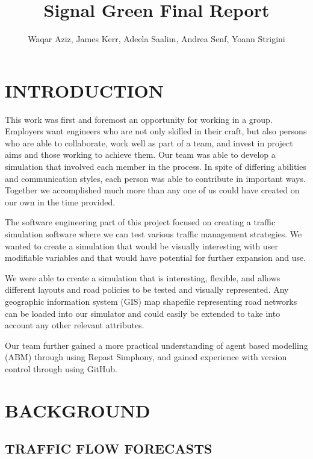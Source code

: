 \documentclass[11pt]{article}
\begin{document}
\title{Signal Green Final Report}

\author{Waqar Aziz, James Kerr, Adeela Saalim, Andrea Senf, Yoann Strigini}

\maketitle 


\section{INTRODUCTION}


This work was first and foremost an opportunity for working in a group. Employers want engineers who are not only skilled in their craft, but also persons who are able to collaborate, work well as part of a team, and invest in project aims and those working to achieve them. Our team was able to develop a simulation that involved each member in the process. In spite of differing abilities and communication styles, each person was able to contribute in important ways. Together we accomplished much more than any one of us could have created on our own in the time provided.

The software engineering part of this project focused on creating a traffic simulation software where we can test various traffic management strategies. We wanted to create a simulation that would be visually interesting with user modifiable variables and that would have potential for further expansion and use.

We were able to create a simulation that is interesting, flexible, and allows different layouts and road policies to be tested and visually represented. Any geographic information system (GIS) map shapefile representing road networks can be loaded into our simulator and could easily be extended to take into account any other relevant attributes.

Our team further gained a more practical understanding of agent based modelling (ABM) through using Repast Simphony, and gained experience with version control through using GitHub.



\section{BACKGROUND}

\subsection{TRAFFIC FLOW FORECASTS}
\end{document}
